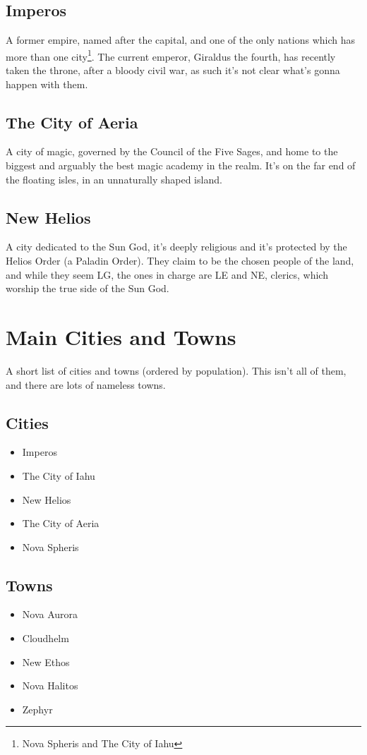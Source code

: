 \subsection{Imperos}
A former empire, named after the capital, and one of the only nations which has more than one city\footnote{Nova Spheris and The City of Iahu}. The current emperor, Giraldus the fourth, has recently taken the throne, after a bloody civil war, as such it's not clear what's gonna happen with them.

\subsection{The City of Aeria}
A city of magic, governed by the Council of the Five Sages, and home to the biggest and arguably the best magic academy in the realm. It's on the far end of the floating isles, in an unnaturally shaped island.

\subsection{New Helios}
A city dedicated to the Sun God, it's deeply religious and it's protected by the Helios Order (a Paladin Order). They claim to be the chosen people of the land, and while they seem LG, the ones in charge are LE and NE, clerics, which worship the true side of the Sun God.

\section{Main Cities and Towns}
A short list of cities and towns (ordered by population). This isn't all of them, and there are lots of nameless towns.
\subsection{Cities}
\begin{itemize}
    \item Imperos
    \item The City of Iahu
    \item New Helios
    \item The City of Aeria
    \item Nova Spheris
\end{itemize}
\subsection{Towns}
\begin{itemize}
    \item Nova Aurora
    \item Cloudhelm
    \item New Ethos
    \item Nova Halitos
    \item Zephyr
\end{itemize}


